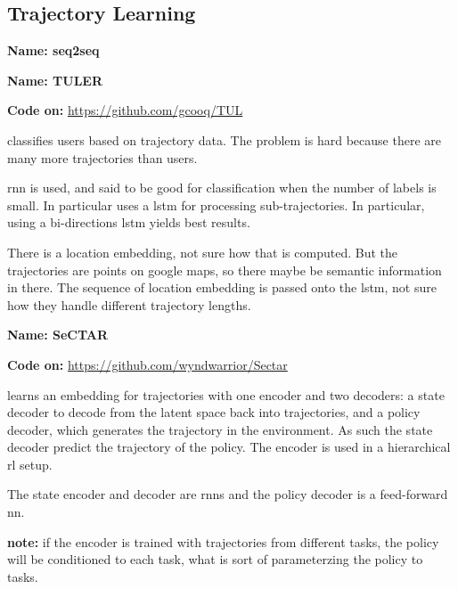 \subsection{Trajectory Learning}\label{sec: traj learning}


\textbf{Name: seq2seq}

\cite{sutskever2014sequence}


\textbf{Name: TULER}

\textbf{Code on:} \url{https://github.com/gcooq/TUL}

\cite{gao2017identifying} classifies users based on trajectory data. The problem is hard because there are many more trajectories than users.

\gls{rnn} is used, and said to be good for classification when the number of labels is small. In particular uses a \gls{lstm} for processing sub-trajectories.
%
In particular, using a bi-directions \gls{lstm} yields best results. 

There is a location embedding, not sure how that is computed. But the trajectories are points on google maps, so there maybe be semantic information in there.
%
The sequence of location embedding is passed onto the \gls{lstm}, not sure how they handle different trajectory lengths.



\textbf{Name: SeCTAR}

\textbf{Code on:} \url{https://github.com/wyndwarrior/Sectar}

\cite{co2018self} learns an embedding for trajectories with one encoder and two decoders: a state decoder to decode from the latent space back into trajectories, and a policy decoder, which generates the trajectory in the environment. As such the state decoder predict the trajectory of the policy. The encoder is used in a hierarchical \gls{rl} setup.

The state encoder and decoder are \glspl{rnn} and the policy decoder is a feed-forward \gls{nn}.

\textbf{note:} if the encoder is trained with trajectories from different tasks, the policy will be conditioned to each task, what is sort of parameterzing the policy to tasks. 


